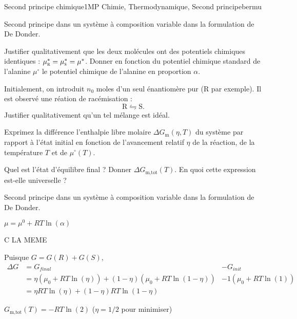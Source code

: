 \begin{exercise}{Second principe chimique}{1}{MP}
{Chimie, Thermodynamique, Second principe}{bermu}

\begin{questions}
    \questioncours Second principe dans un système à composition variable dans la formulation de De Donder.
    
    
    \question Justifier qualitativement que les deux molécules ont des potentiels chimiques identiques : $\mu^\ast_\textsc{r} = \mu^\ast_\textsc{s} = \mu^\ast$. Donner en fonction du potentiel chimique standard de l'alanine $\mu^\circ$ le potentiel chimique de l'alanine en proportion $\alpha$.
    
    \question Initialement, on introduit $n_0$ moles d'un seul énantiomère pur (R par exemple). Il est observé une réation de racémisation :
    $$\mathrm{R \leftrightharpoons S}.$$
    Justifier qualitativement qu'un tel mélange est idéal.
    
    \question Exprimez la différence l'enthalpie libre molaire $\Delta G_\text{m}(\eta,T)$ du système par rapport à l'état initial en fonction de l'avancement relatif $\eta$ de la réaction, de la température $T$ et de $\mu^\circ(T)$.
    
    \question Quel est l'état d'équilibre final ? Donner $\Delta G_\text{m,tot}(T)$. En quoi cette expression est-elle universelle ?
    
\end{questions}

\end{exercise}
\begin{solution}

\begin{questions}
    \questioncours Second principe dans un système à composition variable dans la formulation de De Donder.
    
    
    \question $\mu = \mu^0 + RT \ln(\alpha)$
    
    \question C LA MEME
    
    \question Puisque $G = G(R) + G(S)$,
    \begin{align*}
        \Delta G &= G_{final} &- G_{init} \\
        &= \eta (\mu_0 + RT\ln(\eta)) + (1-\eta)(\mu_0 + RT\ln(1-\eta)) &- 1(\mu_0 + RT\ln(1)) \\
        &= \eta RT\ln(\eta)  + (1-\eta) RT \ln(1-\eta)&
    \end{align*}
    
    \question $G_\text{m,tot}(T) = -RT\ln(2)$ ($\eta= 1/2$ pour minimiser)
    
\end{questions}

\end{solution}


